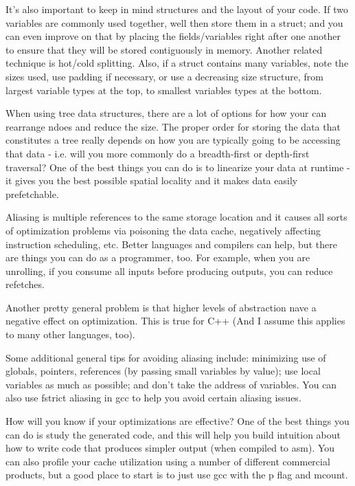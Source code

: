 \documentclass[letterpaper,12pt,titlepage]{article}
\begin{document}
It's also important to keep in mind structures and the layout of your code. If two variables are commonly used together, well then store them in a struct; and you can even improve on that by placing the fields/variables right after one another to ensure that they will be stored contiguously in memory. Another related technique is hot/cold splitting. Also, if a struct contains many variables, note the sizes used, use padding if necessary, or use a decreasing size structure, from largest variable types at the top, to smallest variables types at the bottom.

When using tree data structures, there are a lot of options for how your can rearrange ndoes and reduce the size. The proper order for storing the data that constitutes a tree really depends on how you are typically going to be accessing that data - i.e. will you more commonly do a breadth-first or depth-first traversal? One of the best things you can do is to linearize your data at runtime - it gives you the best possible spatial locality and it makes data easily prefetchable.

Aliasing is multiple references to the same storage location and it causes all sorts of optimization problems via poisoning the data cache, negatively affecting instruction scheduling, etc. Better languages and compilers can help, but there are things you can do as a programmer, too. For example, when you are unrolling, if you consume all inputs before producing outputs, you can reduce refetches.

Another pretty general problem is that higher levels of abstraction nave a negative effect on optimization. This is true for C++ (And I assume this applies to many other languages, too).

Some additional general tips for avoiding aliasing include: minimizing use of globals, pointers, references (by passing small variables by value); use local variables as much as possible; and don't take the address of variables. You can also use fstrict aliasing in gcc to help you avoid certain aliasing issues.

How will you know if your optimizations are effective? One of the best things you can do is study the generated code, and this will help you build intuition about how to write code that produces simpler output (when compiled to asm). You can also profile your cache utilization using a number of different commercial products, but a good place to start is to just use gcc with the p flag and mcount.

\nocite {Ericson}


\end{document}
